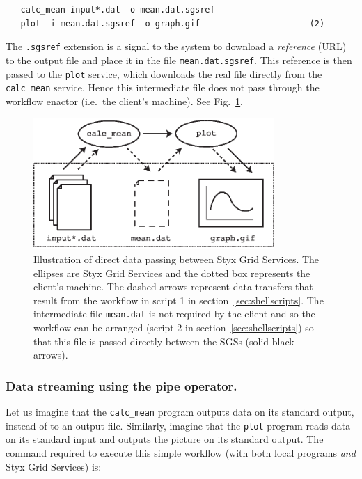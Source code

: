 \documentclass{llncs}
\begin{document}
\begin{verbatim}
   calc_mean input*.dat -o mean.dat.sgsref
   plot -i mean.dat.sgsref -o graph.gif                      (2)
\end{verbatim}

The {\tt .sgsref} extension is a signal to the system to download a {\em reference\/} (URL) to the output file and place it in the file {\tt mean.dat.sgsref}.  This reference is then passed to the {\tt plot} service, which downloads the real file directly from the {\tt calc\_mean} service.  Hence this intermediate file does not pass through the workflow enactor (i.e.\ the client's machine).  See Fig.~\ref{fig:datapassing}.

\begin{figure}
\begin{center}
\includegraphics[height=5cm]{datapassing.eps}
\end{center}
\caption{Illustration of direct data passing between Styx Grid Services.  The ellipses are Styx Grid Services and the dotted box represents the client's machine.  The dashed arrows represent data transfers that result from the workflow in script 1 in section~\ref{sec:shellscripts}.  The intermediate file {\tt mean.dat} is not required by the client and so the workflow can be arranged (script 2 in section~\ref{sec:shellscripts}) so that this file is passed directly between the SGSs (solid black arrows).}\label{fig:datapassing}
\end{figure}


\subsubsection{Data streaming using the pipe operator.}\label{sec:pipes}
Let us imagine that the {\tt calc\_mean} program outputs data on its standard output, instead of to an output file.  Similarly, imagine that the {\tt plot} program reads data on its standard input and outputs the picture on its standard output.  The command required to execute this simple workflow (with both local programs {\em and\/} Styx Grid Services) is:
\end{document}
